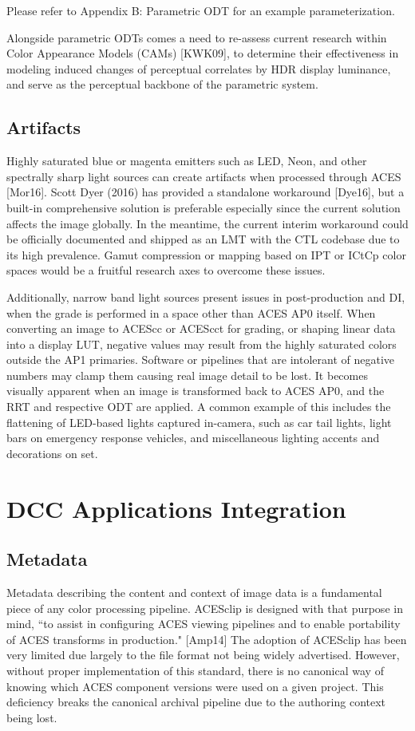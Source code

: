 \documentclass[conference]{IEEEtran}
\begin{document}
Please refer to Appendix B: Parametric ODT for an example parameterization.

Alongside parametric ODTs comes a need to re-assess current research within Color Appearance Models (CAMs) [KWK09], to determine their effectiveness in modeling induced changes of perceptual correlates by HDR display luminance, and serve as the perceptual backbone of the parametric system.

\subsection{Artifacts}
Highly saturated blue or magenta emitters such as LED, Neon, and other spectrally sharp light sources can create artifacts when processed through ACES [Mor16]. Scott Dyer (2016) has provided a standalone workaround [Dye16], but a built-in comprehensive solution is preferable especially since the current solution affects the image globally. In the meantime, the current interim workaround could be officially documented and shipped as an LMT with the CTL codebase due to its high prevalence. Gamut compression or mapping based on IPT or ICtCp color spaces would be a fruitful research axes to overcome these issues.

Additionally, narrow band light sources present issues in post-production and DI, when the grade is performed in a space other than ACES AP0 itself.  When converting an image to ACEScc or ACEScct for grading, or shaping linear data into a display LUT, negative values may result from the highly saturated colors outside the AP1 primaries. Software or pipelines that are intolerant of negative numbers may clamp them causing real image detail to be lost. It becomes visually apparent when an image is transformed back to ACES AP0, and the RRT and respective ODT are applied. A common example of this includes the flattening of LED-based lights captured in-camera, such as car tail lights, light bars on emergency response vehicles, and miscellaneous lighting accents and decorations on set.

\section{DCC Applications Integration}

\subsection{Metadata}
Metadata describing the content and context of image data is a fundamental piece of any color processing pipeline. ACESclip is designed with that purpose in mind, ``to assist in configuring ACES viewing pipelines and to enable portability of ACES transforms in production." [Amp14] The adoption of ACESclip has been very limited due largely to the file format not being widely advertised. However, without proper implementation of this standard, there is no canonical way of knowing which ACES component versions were used on a given project. This deficiency breaks the canonical archival pipeline due to the authoring context being lost.
\end{document}
